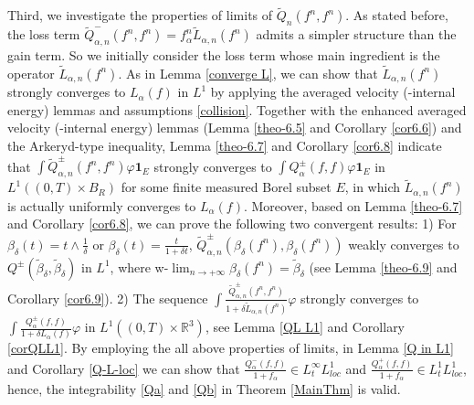 \documentclass[reqno,11pt]{amsart}
\numberwithin{equation}{section}
\def\R{\mathbb{R}}
\begin{document}
Third, we investigate the properties of limits of $\tilde{Q}_n (f^n, f^n )$. As stated before, the loss term $\tilde{Q}_{\alpha, n}^- (f^n, f^n) = f^n_\alpha \tilde{L}_{\alpha, n} (f^n)$ admits a simpler structure than the gain term. So we initially consider the loss term whose main ingredient is the operator $\tilde{L}_{\alpha, n} (f^n)$. As in Lemma \ref{converge L}, we can show that $ \tilde{L}_{\alpha, n} (f^n) $ strongly converges to $ L_\alpha (f) $ in $L^1$ by applying the averaged velocity (-internal energy) lemmas and assumptions \eqref{collision}. Together with the enhanced averaged velocity (-internal energy) lemmas (Lemma \ref{theo-6.5} and Corollary \ref{cor6.6}) and the Arkeryd-type inequality, Lemma \ref{theo-6.7} and Corollary \ref{cor6.8} indicate that $\int \tilde{Q}^\pm_{\alpha, n} (f^n, f^n) \varphi \mathbf{1}_{E}$ strongly converges to $\int Q^\pm_\alpha (f,f) \varphi \mathbf{1}_{E}$ in $L^1 ((0, T) \times B_R)$ for some finite measured Borel subset $E$, in which $ \tilde{L}_{\alpha, n} (f^n) $ is actually uniformly converges to $L_\alpha (f)$. Moreover, based on Lemma \ref{theo-6.7} and Corollary \ref{cor6.8}, we can prove the following two convergent results: 1) For $\beta_\delta (t) = t \wedge \frac{1}{\delta}$ or $\beta_\delta (t) = \frac{t}{1 + \delta t}$, $\tilde{Q}^\pm_{\alpha, n} (\beta_\delta (f^n), \beta_\delta (f^n))$ weakly converges to $Q^\pm (\tilde{\beta}_\delta, \tilde{\beta}_\delta)$ in $L^1$, where w-$\lim_{n \to + \infty} \beta_\delta (f^n) = \tilde{\beta}_\delta$ (see Lemma \ref{theo-6.9} and Corollary \ref{cor6.9}). 2) The sequence $\int \frac{ \tilde{Q}^\pm_{\alpha, n} (f^n, f^n) }{1 + \delta \tilde{L}_{\alpha, n} (f^n) } \varphi$ strongly converges to $ \int \frac{ Q^\pm_{\alpha} (f, f) }{1 + \delta L_{\alpha} (f) } \varphi $ in $ L^1 ( (0, T) \times \R^3 ) $, see Lemma \ref{QL L1} and Corollary \ref{corQLL1}. By employing the all above properties of limits, in Lemma \ref{Q in L1} and Corollary \ref{Q-L-loc} we can show that $\frac{Q_\alpha^- (f, f) }{1 + f_\alpha} \in L^\infty_t L^1_{loc}$ and $\frac{Q^+_\alpha (f, f)}{1 + f_\alpha} \in L^1_t L^1_{loc}$, hence, the integrability \eqref{Qa} and \eqref{Qb} in Theorem \ref{MainThm} is valid.
\end{document}
